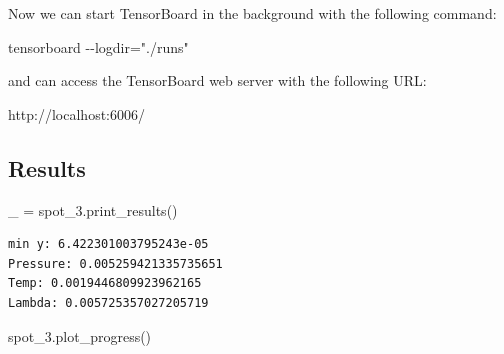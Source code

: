 \documentclass[
  letterpaper,
  DIV=11,
  numbers=noendperiod]{scrreprt}
\newenvironment{Shaded}{\begin{snugshade}}{\end{snugshade}}
\newcommand{\NormalTok}[1]{\textcolor[rgb]{0.00,0.23,0.31}{#1}}
\newcommand{\OperatorTok}[1]{\textcolor[rgb]{0.37,0.37,0.37}{#1}}
\begin{document}
\begin{tcolorbox}[enhanced jigsaw, coltitle=black, bottomrule=.15mm, breakable, toprule=.15mm, colframe=quarto-callout-note-color-frame, title=\textcolor{quarto-callout-note-color}{\faInfo}\hspace{0.5em}{Note}, colbacktitle=quarto-callout-note-color!10!white, opacityback=0, left=2mm, leftrule=.75mm, colback=white, rightrule=.15mm, bottomtitle=1mm, toptitle=1mm, titlerule=0mm, arc=.35mm, opacitybacktitle=0.6]

Now we can start TensorBoard in the background with the following
command:

\begin{Shaded}
\begin{Highlighting}[]
\NormalTok{tensorboard {-}{-}logdir="./runs"}
\end{Highlighting}
\end{Shaded}

and can access the TensorBoard web server with the following URL:

\begin{Shaded}
\begin{Highlighting}[]
\NormalTok{http://localhost:6006/}
\end{Highlighting}
\end{Shaded}

\end{tcolorbox}

\subsection{Results}\label{results}

\begin{Shaded}
\begin{Highlighting}[]
\NormalTok{\_ }\OperatorTok{=}\NormalTok{ spot\_3.print\_results()}
\end{Highlighting}
\end{Shaded}

\begin{verbatim}
min y: 6.422301003795243e-05
Pressure: 0.005259421335735651
Temp: 0.0019446809923962165
Lambda: 0.005725357027205719
\end{verbatim}

\begin{Shaded}
\begin{Highlighting}[]
\NormalTok{spot\_3.plot\_progress()}
\end{Highlighting}
\end{Shaded}
\end{document}
